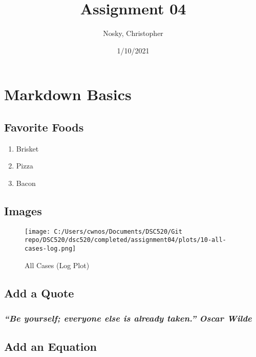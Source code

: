\documentclass[
]{article}
\title{Assignment 04}
\author{Nosky, Christopher}
\date{1/10/2021}
\providecommand{\tightlist}{%
  \setlength{\itemsep}{0pt}\setlength{\parskip}{0pt}}
\begin{document}
\maketitle

\hypertarget{markdown-basics}{%
\section{Markdown Basics}\label{markdown-basics}}

\hypertarget{favorite-foods}{%
\subsection{Favorite Foods}\label{favorite-foods}}

\begin{enumerate}
\def\labelenumi{\arabic{enumi}.}
\tightlist
\item
  Brisket
\item
  Pizza
\item
  Bacon
\end{enumerate}

\hypertarget{images}{%
\subsection{Images}\label{images}}

\begin{figure}
\centering
\texttt{[image: C:/Users/cwnos/Documents/DSC520/Git repo/DSC520/dsc520/completed/assignment04/plots/10-all-cases-log.png]}
\caption{All Cases (Log Plot)}
\end{figure}

\hypertarget{add-a-quote}{%
\subsection{Add a Quote}\label{add-a-quote}}

\hypertarget{be-yourself-everyone-else-is-already-taken.-oscar-wilde}{%
\subsubsection{\texorpdfstring{\emph{``Be yourself; everyone else is
already taken.''} \emph{Oscar
Wilde}}{``Be yourself; everyone else is already taken.'' Oscar Wilde}}\label{be-yourself-everyone-else-is-already-taken.-oscar-wilde}}

\hypertarget{add-an-equation}{%
\subsection{Add an Equation}\label{add-an-equation}}
\end{document}

